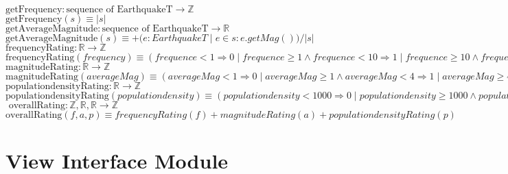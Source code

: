 \documentclass[12pt]{article}
\begin{document}
\noindent $\text{getFrequency}: \text{sequence of EarthquakeT} \rightarrow \mathbb{Z}$\\
\noindent $\text{getFrequency}(s) \equiv |s| $\\


\noindent $\text{getAverageMagnitude}: \text{sequence of EarthquakeT} \rightarrow \mathbb{R}$\\
\noindent $\text{getAverageMagnitude}(s) \equiv +(e: EarthquakeT \;|\; e \in s: e.getMag()) / |s| $\\


\noindent $\text{frequencyRating}: \mathbb{R} \rightarrow \mathbb{Z}$\\
\noindent $\text{frequencyRating}(frequency) \equiv (frequence < 1 \Rightarrow 0 \;|\; frequence \ge 1 \land frequence < 10 \Rightarrow 1 \;|\; frequence \ge 10 \land frequence < 100 \Rightarrow 2\;|\; frequence \ge 100 \land frequence < 1000 \Rightarrow 3\;|\; frequence \ge 1000  \Rightarrow 4) $\\


\noindent $\text{magnitudeRating}: \mathbb{R} \rightarrow \mathbb{Z}$\\
\noindent $\text{magnitudeRating}(averageMag) \equiv (averageMag < 1 \Rightarrow 0 \;|\; averageMag \ge 1 \land averageMag < 4 \Rightarrow 1 \;|\; averageMag \ge 4 \land averageMag < 6 \Rightarrow 2\;|\; averageMag \ge 6 \land averageMag < 7 \Rightarrow 3\;|\; averageMag \ge 7 \Rightarrow 4) $\\

\noindent $\text{populationdensityRating}: \mathbb{R} \rightarrow \mathbb{Z}$\\
\noindent $\text{populationdensityRating}(populationdensity) \equiv (populationdensity < 1000 \Rightarrow 0 \;|\; populationdensity \ge 1000 \land populationdensity < 5000 \Rightarrow 1 \;|\;populationdensity \ge 5000 \Rightarrow 2) $\\

\noindent $\text{ overallRating}: \mathbb{Z}, \mathbb{R}, \mathbb{R} \rightarrow \mathbb{Z}$\\
\noindent $\text{overallRating}(f, a, p) \equiv frequencyRating(f) + magnitudeRating(a) + populationdensityRating(p)$\\






\newpage

\section* {View Interface Module}
\end{document}

